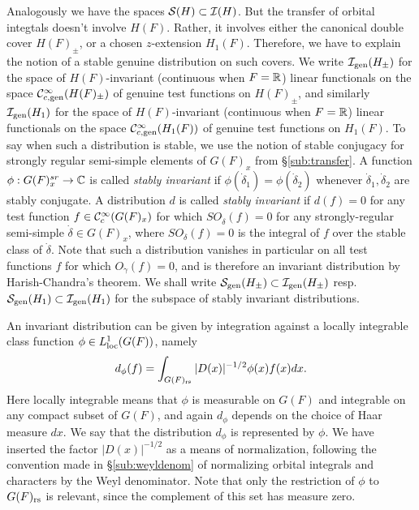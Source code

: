 \documentclass{article}
\theoremstyle{definition}
\numberwithin{equation}{section}
\renewcommand{\-}{\hyp{}}
\begin{document}
Analogously we have the spaces $\mathcal{S}(H) \subset \mathcal{I}(H)$. But the transfer of orbital integtals doesn't involve $H(F)$. Rather, it involves either the canonical double cover $H(F)_\pm$, or a chosen $z$-extension $H_1(F)$. Therefore, we have to explain the notion of a stable genuine distribution on such covers. We write $\mathcal{I}_{\textrm{gen}}(H_\pm)$ for the space of $H(F)$-invariant (continuous when $F=\mathbb{R}$) linear functionals on the space $\mathcal{C}^\infty_{c,\textrm{gen}}(H(F)_\pm)$ of genuine test functions on $H(F)_\pm$, and similarly $\mathcal{I}_{\textrm{gen}}(H_1)$ for the space of $H(F)$-invariant (continuous when $F=\mathbb{R}$) linear functionals on the space $\mathcal{C}^\infty_{c,\textrm{gen}}(H_1(F))$ of genuine test functions on $H_1(F)$. To say when such a distribution is stable, we use the notion of stable conjugacy for strongly regular semi-simple elements of $G(F)_x$ from \S\ref{sub:transfer}. A function $\phi : G(F)_x^{sr} \to \mathbb{C}$ is called \emph{stably invariant} if $\phi(\dot\delta_1)=\phi(\dot\delta_2)$ whenever $\dot\delta_1,\dot\delta_2$ are stably conjugate. A distribution $d$ is called \emph{stably invariant} if $d(f)=0$ for any test function $f \in \mathcal{C}^\infty_c(G(F)_x)$ for which $SO_{\dot\delta}(f)=0$ for any strongly-regular semi-simple $\dot\delta \in G(F)_x$, where $SO_{\dot\delta}(f)=0$ is the integral of $f$ over the stable class of $\dot\delta$. Note that such a distribution vanishes in particular on all test functions $f$ for which $O_{\dot\gamma}(f)=0$, and is therefore an invariant distribution by Harish-Chandra's theorem. We shall write $\mathcal{S}_{\textrm{gen}}(H_\pm) \subset \mathcal{I}_{\textrm{gen}}(H_\pm)$ resp. $\mathcal{S}_{\textrm{gen}}(H_1) \subset \mathcal{I}_{\textrm{gen}}(H_1)$ for the subspace of stably invariant distributions.

An invariant distribution can be given by integration against a locally integrable class function $\phi \in L^1_{\textrm{loc}}(G(F))$, namely 
\[ d_\phi(f) = \int_{G(F)_{\textrm{rs}}} |D(x)|^{-1/2}\phi(x)f(x)dx. \]
Here locally integrable means that $\phi$ is measurable on $G(F)$ and integrable on any compact subset of $G(F)$, and again $d_\phi$ depends on the choice of Haar measure $dx$. We say that the distribution $d_\phi$ is represented by $\phi$. We have inserted the factor $|D(x)|^{-1/2}$ as a means of normalization, following the convention made in \S\ref{sub:weyldenom} of normalizing orbital integrals and characters by the Weyl denominator. Note that only the restriction of $\phi$ to $G(F)_{\textrm{rs}}$ is relevant, since the complement of this set has measure zero.
\end{document}
